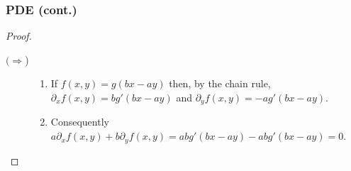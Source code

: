 \documentclass[aspectratio=169,handout]{beamer}
\begin{document}
\begin{frame}
    \frametitle{PDE (cont.)}

    \begin{proof}
        \begin{description}
            \item[\((\Rightarrow\))]
                  \begin{enumerate}
                      \item If \(f(x,y)= g(bx-ay)\) then, by the chain rule,
                            \(\partial_x f(x,y) = bg'(bx-ay)\) and \(\partial_y f(x,y) = -ag'(bx-ay)\).
                      \item
                            Consequently \(a\partial_x f(x,y) + b \partial_y f(x,y) = a bg'(bx-ay) - abg'(bx-ay) = 0\).
                  \end{enumerate}


\end{description}
\end{proof}
\end{frame}
\end{document}
